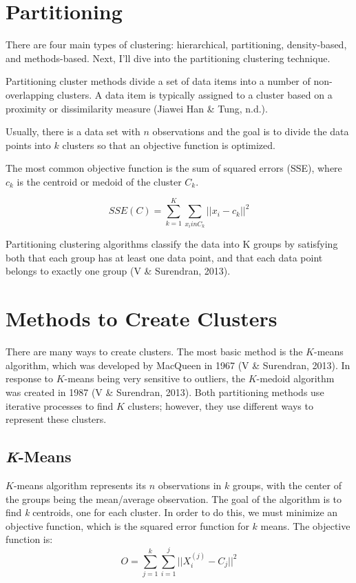\documentclass[12pt,twoside]{amherstthesis}
\begin{document}
  \section{Partitioning}\label{partitioning}
  
  There are four main types of clustering: hierarchical, partitioning,
  density-based, and methods-based. Next, I'll dive into the partitioning
  clustering technique.
  
  Partitioning cluster methods divide a set of data items into a number of
  non-overlapping clusters. A data item is typically assigned to a cluster
  based on a proximity or dissimilarity measure (Jiawei Han \& Tung,
  n.d.).
  
  Usually, there is a data set with \(n\) observations and the goal is to
  divide the data points into \(k\) clusters so that an objective function
  is optimized.
  
  The most common objective function is the sum of squared errors (SSE),
  where \(c_k\) is the centroid or medoid of the cluster \(C_k\).
  
  \[SSE(C)= \sum_{k=1}^K \sum_{x_{i} in C_{k}} ||{x_i}- c_k||^2\]
  
  Partitioning clustering algorithms classify the data into K groups by
  satisfying both that each group has at least one data point, and that
  each data point belongs to exactly one group (V \& Surendran, 2013).
  
  \section{Methods to Create Clusters}\label{methods-to-create-clusters}
  
  There are many ways to create clusters. The most basic method is the
  \(K\)-means algorithm, which was developed by MacQueen in 1967 (V \&
  Surendran, 2013). In response to \(K\)-means being very sensitive to
  outliers, the \(K\)-medoid algorithm was created in 1987 (V \&
  Surendran, 2013). Both partitioning methods use iterative processes to
  find \(K\) clusters; however, they use different ways to represent these
  clusters.
  
  \subsection{\texorpdfstring{\emph{K}-Means}{K-Means}}\label{k-means}
  
  \(K\)-means algorithm represents its \(n\) observations in \(k\) groups,
  with the center of the groups being the mean/average observation. The
  goal of the algorithm is to find \emph{k} centroids, one for each
  cluster. In order to do this, we must minimize an objective function,
  which is the squared error function for \(k\) means. The objective
  function is: \[O= \sum_{j=1}^k \sum_{i=1}^j ||{{X_i^{(j)}- C_j}}||^2\]
  
\end{document}
